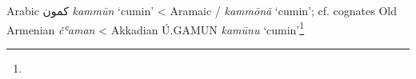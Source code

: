 \begin{etymology}\label{ety:kammun}
Arabic {كمون} \textit{kammūn} `cumin'
< Aramaic {/} \textit{kammōnā} `cumin'; cf. cognates Old Armenian  \textit{čʿaman}
< Akkadian { Ú.GAMUN} \textit{kamūnu} `cumin'\footnote{}
\end{etymology}